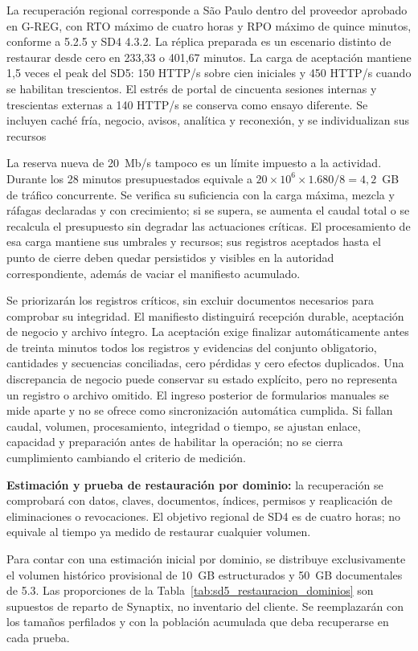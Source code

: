 La recuperación regional corresponde a São Paulo dentro del proveedor aprobado en G-REG, con RTO máximo de cuatro horas y RPO máximo de quince minutos, conforme a 5.2.5 y SD4 4.3.2. La réplica preparada es un escenario distinto de restaurar desde cero en 233,33 o 401,67 minutos. La carga de aceptación mantiene 1,5 veces el peak del SD5: 150 HTTP/s sobre cien iniciales y 450 HTTP/s cuando se habilitan trescientos. El estrés de portal de cincuenta sesiones internas y trescientas externas a 140 HTTP/s se conserva como ensayo diferente. Se incluyen caché fría, negocio, avisos, analítica y reconexión, y se individualizan sus recursos

La reserva nueva de 20~Mb/s tampoco es un límite impuesto a la actividad. Durante los 28 minutos presupuestados equivale a \(20\times10^6\times1.680/8=4{,}2\)~GB de tráfico concurrente. Se verifica su suficiencia con la carga máxima, mezcla y ráfagas declaradas y con crecimiento; si se supera, se aumenta el caudal total o se recalcula el presupuesto sin degradar las actuaciones críticas. El procesamiento de esa carga mantiene sus umbrales y recursos; sus registros aceptados hasta el punto de cierre deben quedar persistidos y visibles en la autoridad correspondiente, además de vaciar el manifiesto acumulado.

Se priorizarán los registros críticos, sin excluir documentos necesarios para comprobar su integridad. El manifiesto distinguirá recepción durable, aceptación de negocio y archivo íntegro. La aceptación exige finalizar automáticamente antes de treinta minutos todos los registros y evidencias del conjunto obligatorio, cantidades y secuencias conciliadas, cero pérdidas y cero efectos duplicados. Una discrepancia de negocio puede conservar su estado explícito, pero no representa un registro o archivo omitido. El ingreso posterior de formularios manuales se mide aparte y no se ofrece como sincronización automática cumplida. Si fallan caudal, volumen, procesamiento, integridad o tiempo, se ajustan enlace, capacidad y preparación antes de habilitar la operación; no se cierra cumplimiento cambiando el criterio de medición.

\textbf{Estimación y prueba de restauración por dominio:} la recuperación se comprobará con datos, claves, documentos, índices, permisos y reaplicación de eliminaciones o revocaciones. El objetivo regional de SD4 es de cuatro horas; no equivale al tiempo ya medido de restaurar cualquier volumen.

Para contar con una estimación inicial por dominio, se distribuye exclusivamente el volumen histórico provisional de 10~GB estructurados y 50~GB documentales de 5.3. Las proporciones de la Tabla~\ref{tab:sd5_restauracion_dominios} son supuestos de reparto de Synaptix, no inventario del cliente. Se reemplazarán con los tamaños perfilados y con la población acumulada que deba recuperarse en cada prueba.

